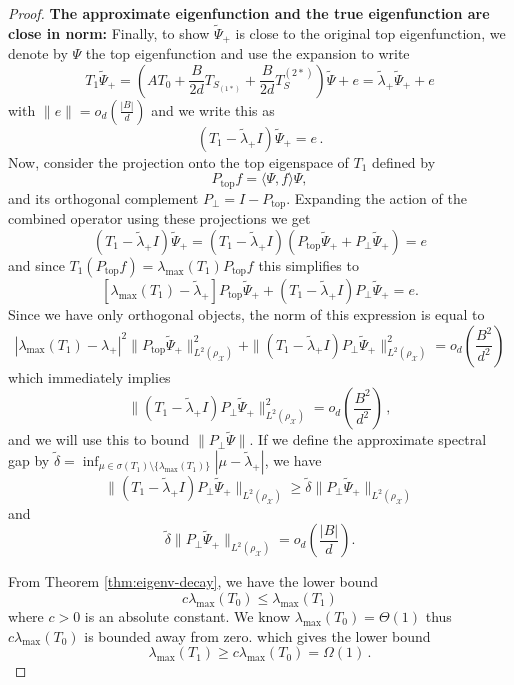\begin{proof}
    {\bf The approximate eigenfunction and the true eigenfunction are close in norm:}
    Finally, to show $\tilde{\Psi}_{+}$ is close to the original top eigenfunction, we denote by $\Psi$ the top eigenfunction and use the expansion to write
    \[
        T_1 \tilde{\Psi}_{+} = \left(AT_0 + \frac{B}{2d}T_{S_{(1*)}} + \frac{B}{2d}T_{S}^{(2*)}\right)\tilde{\Psi} + e = \tilde{\lambda}_{+}\tilde\Psi_{+} + e
    \]
    with $\| e \| = o_d\left(\frac{|B|}{d}\right)$ and we write this as
    \[
        (T_1 - \tilde{\lambda}_{+} I)\tilde{\Psi}_{+} = e\, .
    \]
    Now, consider the projection onto the top eigenspace of $T_1$ defined by
    \[
        P_{\text{top}}f =  \langle \Psi, f\rangle \Psi,
    \]
    and its orthogonal complement $P_{\perp} = I - P_{\text{top}}$. Expanding the action of the combined operator using these projections we get
    \[
        (T_1 - \tilde{\lambda}_{+} I)\tilde{\Psi}_{+} = (T_1 - \tilde{\lambda}_{+} I)(P_{\text{top}}\tilde{\Psi}_{+} + P_{\perp}\tilde{\Psi}_{+}) = e
    \]
    and since $T_1(P_{\text{top}} f) = \lambda_{\max}(T_1) P_{\text{top}} f$ this simplifies to
    \[
        [\lambda_{\max}(T_1) - \tilde{\lambda}_{+}]P_{\text{top}} \tilde{\Psi}_{+} + (T_1 - \tilde{\lambda}_{+} I)P_{\perp}\tilde{\Psi}_{+} = e.
    \]
    Since we have only orthogonal objects, the norm of this expression is equal to
    \[
        |\lambda_{\max}(T_1)- \lambda_{+}|^2\| P_{\text{top}} \tilde{\Psi}_{+} \|_{L^2(\rho_{\mathcal X})} ^2 + \|(T_1 - \tilde{\lambda}_{+} I)P_{\perp}\tilde{\Psi}_{+}\|_{L^2(\rho_{\mathcal X})} ^2 = o_d\left(\frac{B^2}{d^2}\right)
    \]
    which immediately implies
    \[
        \|(T_1 - \tilde{\lambda}_{+} I)P_{\perp}\tilde{\Psi}_{+}\|_{L^2(\rho_{\mathcal X})} ^2 = o_d\left(\frac{B^2}{d^2}\right)\, ,
    \]
    and we will use this to bound $\| P_{\perp} \tilde{\Psi}\|$. If we define the approximate spectral gap by $\tilde{\delta} = \inf_{\mu \in \sigma(T_1)\setminus\{\lambda_{\max}(T_1)\}}|\mu - \tilde{\lambda}_{+}|$, we have
    \[
        \| (T_1 - \tilde{\lambda}_{+} I)P_{\perp}\tilde{\Psi}_{+} \|_{L^2(\rho_{\mathcal X})}  \geq  \tilde{\delta}\| P_{\perp}\tilde{\Psi}_{+} \|_{L^2(\rho_{\mathcal X})} 
    \]
    and
    \[
        \tilde{\delta} \| P_{\perp}\tilde{\Psi}_{+} \|_{L^2(\rho_{\mathcal X})}  = o_d\left(\frac{|B|}{d}\right).
    \]

    From Theorem \ref{thm:eigenv-decay}, we have the lower bound
    \[
        c\lambda_{\max}(T_0) \leq \lambda_{\max}(T_1)
    \]
    where $c > 0$ is an absolute constant. We know $\lambda_{\max}(T_0) = \Theta(1)$ thus $c\lambda_{\max}(T_0)$ is bounded away from zero. which gives the lower bound
    \[
        \lambda_{\max}(T_1) \geq c\lambda_{\max}(T_0) = \Omega(1)\, .
    \]


\end{proof}
